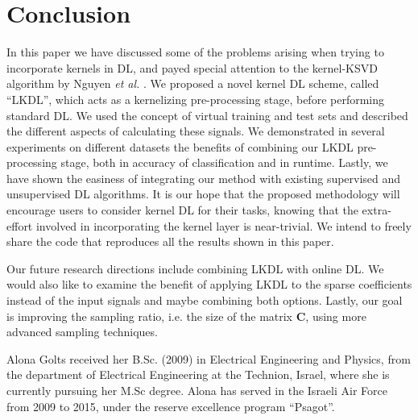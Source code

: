 \documentclass[journal]{IEEEtran}
\newcommand{\bC}{\mathbf{C}}
\begin{document}
\section{Conclusion} \label{Conclusion}

In this paper we have discussed some of the problems arising when trying to incorporate kernels in DL, and payed special attention to the kernel-KSVD algorithm by Nguyen \textit{et al.} \cite{KDL,KDL2}.
We proposed a novel kernel DL scheme, called ``LKDL'', which acts as a kernelizing pre-processing stage, before performing standard DL.
We used the concept of virtual training and test sets and described the different aspects of calculating these signals.
We demonstrated in several experiments on different datasets the benefits of combining our LKDL pre-processing stage, both in accuracy of classification and in runtime.
Lastly, we have shown the easiness of integrating our method with existing supervised and unsupervised DL algorithms. It is our hope that the proposed methodology will encourage users to consider kernel DL for their tasks, knowing that the extra-effort involved in incorporating the kernel layer is near-trivial. We intend to freely share the code that reproduces all the results shown in this paper.

Our future research directions include combining LKDL with online DL.
We would also like to examine the benefit of applying LKDL to the sparse coefficients instead of the input signals and maybe combining both options.
Lastly, our goal is improving the sampling ratio, i.e. the size of the matrix $\bC$, using more advanced sampling techniques.















\ifCLASSOPTIONcaptionsoff
  \newpage
\fi









\vspace*{-30pt}

\begin{IEEEbiography}{Alona Golts}
received her B.Sc. (2009) in Electrical Engineering and Physics,
from the department of Electrical Engineering at the Technion,
Israel, where she is currently pursuing her M.Sc degree.
Alona has served in the Israeli Air Force from 2009 to 2015, under the reserve excellence program ``Psagot''.
\end{IEEEbiography}
\end{document}
